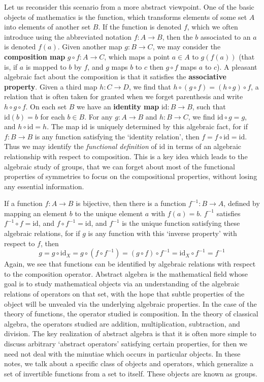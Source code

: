 Let us reconsider this scenario from a more abstract viewpoint. One of the basic objects of mathematics is the function, which transforms elements of some set $A$ into elements of another set $B$. If the function is denoted $f$, which we often introduce using the abbreviated notation $f: A \to B$, then the $b$ associated to an $a$ is denoted $f(a)$. Given another map $g: B \to C$, we may consider the {\bf composition map} $g \circ f: A \to C$, which maps a point $a \in A$ to $g(f(a))$ (that is, if $a$ is mapped to $b$ by $f$, and $g$ maps $b$ to $c$ then $g \circ f$ maps $a$ to $c$). A pleasant algebraic fact about the composition is that it satisfies the {\bf associative property}. Given a third map $h:C \to D$, we find that $h \circ (g \circ f) = (h \circ g) \circ f$, a relation that is often taken for granted when we forget parenthesis and write $h \circ g \circ f$. On each set $B$ we have an {\bf identity map} $\text{id}: B \to B$, such that $\text{id}(b) = b$ for each $b \in B$. For any $g: A \to B$ and $h: B \to C$, we find $\text{id} \circ g = g$, and $h \circ \text{id} = h$. The map $\text{id}$ is uniquely determined by this algebraic fact, for if $f: B \to B$ is any function satisfying the `identity relation', then $f = f \circ \text{id} = \text{id}$. Thus we may identify the {\it functional definition} of $\text{id}$ in terms of an algebraic relationship with respect to composition. This is a key idea which leads to the algebraic study of groups, that we can forget about most of the functional properties of symmetries to focus on the compositional properties, without losing any essential information.

If a function $f: A \to B$ is bijective, then there is a function $f^{-1}: B \to A$, defined by mapping an element $b$ to the unique element $a$ with $f(a) = b$. $f^{-1}$ satisfies $f^{-1} \circ f = \text{id}$, and $f \circ f^{-1} = \text{id}$, and $f^{-1}$ is the unique function satisfying these algebraic relations, for if $g$ is any function with this `inverse property' with respect to $f$, then
%
\[ g = g \circ \text{id}_X = g \circ (f \circ f^{-1}) = (g \circ f) \circ f^{-1} = \text{id}_X \circ f^{-1} = f^{-1} \]
%
Again, we see that functions can be identified by algebraic relations with respect to the composition operator. Abstract algebra is the mathematical field whose goal is to study mathematical objects via an understanding of the algebraic relations of operators on that set, with the hope that subtle properties of the object will be unvealed via the underlying algebraic properties. In the case of the theory of functions, the operator studied is composition. In the theory of classical algebra, the operators studied are addition, multiplication, subtraction, and division. The key realization of abstract algebra is that it is often more simple to discuss arbitrary `abstract operators' satisfying certain properties, for then we need not deal with the minutiae which occurs in particular objects. In these notes, we talk about a specific class of objects and operators, which generalize a set of invertible functions from a set to itself. These objects are known as groups.


